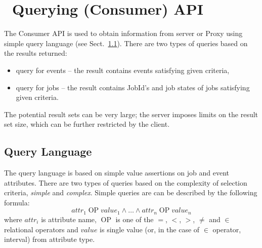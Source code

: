 %
%

\section{\LB\ Querying (Consumer) API}
\label{s:Consumer-API}
The \LB Consumer API is used to obtain information from \LB server
or Proxy using simple query language (see
Sect.~\ref{s:querylang}). There are two types of queries based
on the results returned:
\begin{itemize}
\item query for events -- the result contains events satisfying given
criteria,
\item query for jobs -- the result contains JobId's and job states of jobs
satisfying given criteria.
\end{itemize}
The potential result sets can be very large; the \LB server imposes
limits on the result set size, which can be further restricted by the
client.


\subsection{Query Language}
\label{s:querylang}
The \LB query language is based on simple value assertions on job and
event attributes. There are two types of queries based on the
complexity of selection criteria, \textit{simple} and
\textit{complex}.
Simple queries are can be described by the following formula:
\begin{displaymath}
\textit{attr}_1 \mathop{\textrm{ OP }} \textit{value}_1 \wedge \dots \wedge
\textit{attr}_n \mathop{\textrm{ OP }} \textit{value}_n
\end{displaymath}
where $\textit{attr}_i$ is attribute name, $\mathop{\textrm{ OP }}$ is
one of the $=$, $<$, $>$, $\neq$ and $\in$ relational operators and
$\textit{value}$ is single value (or, in the case of $\in$ operator,
interval) from attribute type.

